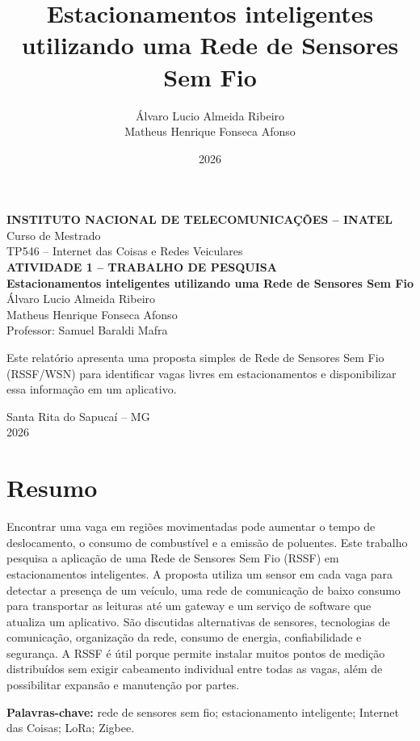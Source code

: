 \documentclass[11pt,a4paper]{article}
\title{\textbf{Estacionamentos inteligentes utilizando uma Rede de Sensores Sem Fio}}
\author{Álvaro Lucio Almeida Ribeiro\\Matheus Henrique Fonseca Afonso}
\date{2026}
\begin{document}
\hypersetup{pageanchor=false}
\begin{titlepage}
\centering
\vspace*{1cm}
{\large \textbf{INSTITUTO NACIONAL DE TELECOMUNICAÇÕES -- INATEL}}\\[0.4cm]
{\large Curso de Mestrado}\\[0.4cm]
{\large TP546 -- Internet das Coisas e Redes Veiculares}\\[1.6cm]
{\large \textbf{ATIVIDADE 1 -- TRABALHO DE PESQUISA}}\\[1.4cm]
{\LARGE \textbf{Estacionamentos inteligentes utilizando uma Rede de Sensores Sem Fio}}\\[1.5cm]
{\large Álvaro Lucio Almeida Ribeiro\\[0.2cm]Matheus Henrique Fonseca Afonso}\\[0.8cm]
{\large Professor: Samuel Baraldi Mafra}
\vfill
\begin{minipage}{0.82\textwidth}
\centering
Este relatório apresenta uma proposta simples de Rede de Sensores Sem Fio (RSSF/WSN) para identificar vagas livres em estacionamentos e disponibilizar essa informação em um aplicativo.
\end{minipage}
\vfill
{\large Santa Rita do Sapucaí -- MG\\2026}
\end{titlepage}

\hypersetup{pageanchor=true}
\twocolumn
\section*{Resumo}
Encontrar uma vaga em regiões movimentadas pode aumentar o tempo de deslocamento, o consumo de combustível e a emissão de poluentes. Este trabalho pesquisa a aplicação de uma Rede de Sensores Sem Fio (RSSF) em estacionamentos inteligentes. A proposta utiliza um sensor em cada vaga para detectar a presença de um veículo, uma rede de comunicação de baixo consumo para transportar as leituras até um gateway e um serviço de software que atualiza um aplicativo. São discutidas alternativas de sensores, tecnologias de comunicação, organização da rede, consumo de energia, confiabilidade e segurança. A RSSF é útil porque permite instalar muitos pontos de medição distribuídos sem exigir cabeamento individual entre todas as vagas, além de possibilitar expansão e manutenção por partes.

\noindent\textbf{Palavras-chave:} rede de sensores sem fio; estacionamento inteligente; Internet das Coisas; LoRa; Zigbee.
\end{document}

